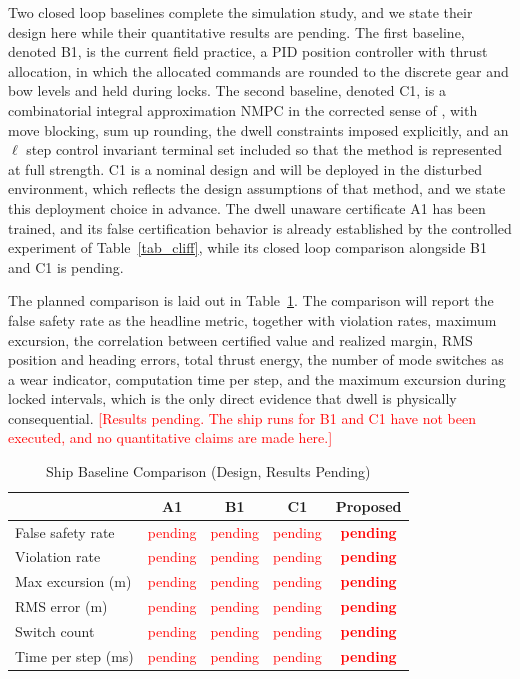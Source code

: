 \documentclass[journal]{IEEEtran}
\begin{document}
Two closed loop baselines complete the simulation study, and we state their design here while their quantitative results are pending. The first baseline, denoted B1, is the current field practice, a PID position controller with thrust allocation, in which the allocated commands are rounded to the discrete gear and bow levels and held during locks. The second baseline, denoted C1, is a combinatorial integral approximation NMPC in the corrected sense of \cite{chenlazar2022,sager2011}, with move blocking, sum up rounding, the dwell constraints imposed explicitly, and an $\ell$ step control invariant terminal set included so that the method is represented at full strength. C1 is a nominal design and will be deployed in the disturbed environment, which reflects the design assumptions of that method, and we state this deployment choice in advance. The dwell unaware certificate A1 has been trained, and its false certification behavior is already established by the controlled experiment of Table~\ref{tab_cliff}, while its closed loop comparison alongside B1 and C1 is pending.

The planned comparison is laid out in Table~\ref{tab_ship_baseline}. The comparison will report the false safety rate as the headline metric, together with violation rates, maximum excursion, the correlation between certified value and realized margin, RMS position and heading errors, total thrust energy, the number of mode switches as a wear indicator, computation time per step, and the maximum excursion during locked intervals, which is the only direct evidence that dwell is physically consequential. \textcolor{red}{[Results pending. The ship runs for B1 and C1 have not been executed, and no quantitative claims are made here.]}

\begin{table}[!t]
\renewcommand{\arraystretch}{1.4}
\caption{Ship Baseline Comparison (Design, Results Pending)}
\label{tab_ship_baseline}
\centering
\begin{tabular}{lcccc}
\toprule
 & A1 & B1 & C1 & \textbf{Proposed} \\
\midrule
False safety rate & \textcolor{red}{pending} & \textcolor{red}{pending} & \textcolor{red}{pending} & \textcolor{red}{\textbf{pending}} \\
Violation rate & \textcolor{red}{pending} & \textcolor{red}{pending} & \textcolor{red}{pending} & \textcolor{red}{\textbf{pending}} \\
Max excursion (m) & \textcolor{red}{pending} & \textcolor{red}{pending} & \textcolor{red}{pending} & \textcolor{red}{\textbf{pending}} \\
RMS error (m) & \textcolor{red}{pending} & \textcolor{red}{pending} & \textcolor{red}{pending} & \textcolor{red}{\textbf{pending}} \\
Switch count & \textcolor{red}{pending} & \textcolor{red}{pending} & \textcolor{red}{pending} & \textcolor{red}{\textbf{pending}} \\
Time per step (ms) & \textcolor{red}{pending} & \textcolor{red}{pending} & \textcolor{red}{pending} & \textcolor{red}{\textbf{pending}} \\
\bottomrule
\end{tabular}
\end{table}
\end{document}
